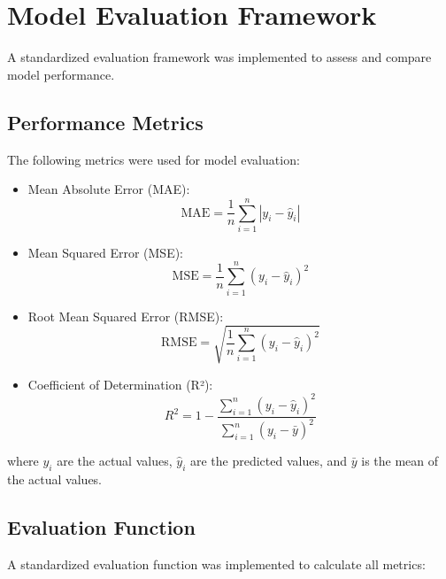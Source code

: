 \documentclass[12pt]{article}
\begin{document}
\section{Model Evaluation Framework}
\label{sec:evaluation_framework}

A standardized evaluation framework was implemented to assess and compare model performance.

\subsection{Performance Metrics}
\label{subsec:performance_metrics}

The following metrics were used for model evaluation:

\begin{itemize}
    \item Mean Absolute Error (MAE):
    \begin{equation}
    \text{MAE} = \frac{1}{n}\sum_{i=1}^{n}|y_i - \hat{y}_i|
    \end{equation}
    
    \item Mean Squared Error (MSE):
    \begin{equation}
    \text{MSE} = \frac{1}{n}\sum_{i=1}^{n}(y_i - \hat{y}_i)^2
    \end{equation}
    
    \item Root Mean Squared Error (RMSE):
    \begin{equation}
    \text{RMSE} = \sqrt{\frac{1}{n}\sum_{i=1}^{n}(y_i - \hat{y}_i)^2}
    \end{equation}
    
    \item Coefficient of Determination (R²):
    \begin{equation}
    R^2 = 1 - \frac{\sum_{i=1}^{n}(y_i - \hat{y}_i)^2}{\sum_{i=1}^{n}(y_i - \bar{y})^2}
    \end{equation}
\end{itemize}

where $y_i$ are the actual values, $\hat{y}_i$ are the predicted values, and $\bar{y}$ is the mean of the actual values.

\subsection{Evaluation Function}
\label{subsec:evaluation_function}

A standardized evaluation function was implemented to calculate all metrics:
\end{document}
